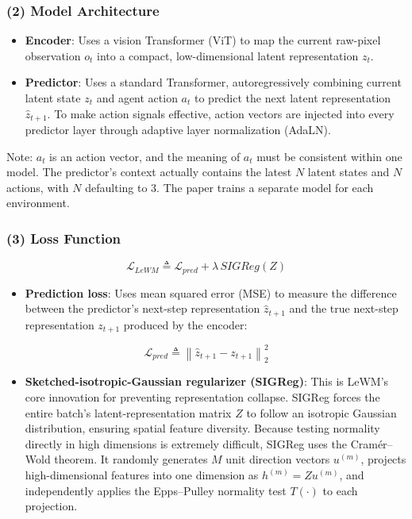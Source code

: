\hypertarget{model-architecture-1}{%
\subsubsection{(2) Model Architecture}\label{model-architecture-1}}

\begin{itemize}
\tightlist
\item
  \textbf{Encoder}: Uses a vision Transformer (ViT) to map the current raw-pixel observation \(o_t\) into a compact, low-dimensional latent representation \(z_t\).
\item
  \textbf{Predictor}: Uses a standard Transformer, autoregressively combining current latent state \(z_t\) and agent action \(a_t\) to predict the next latent representation \(\hat{z}_{t+1}\). To make action signals effective, action vectors are injected into every predictor layer through adaptive layer normalization (AdaLN).
\end{itemize}

Note: \(a_t\) is an action vector, and the meaning of \(a_t\) must be consistent within one model. The predictor's context actually contains the latest \(N\) latent states and \(N\) actions, with \(N\) defaulting to 3. The paper trains a separate model for each environment.

\hypertarget{loss-function-2}{%
\subsubsection{(3) Loss Function}\label{loss-function-2}}

\[
\mathcal{L}_{LeWM} \triangleq \mathcal{L}_{pred} + \lambda\,SIGReg(Z)
\]

\begin{itemize}
\tightlist
\item
{}
  \textbf{Prediction loss}: Uses mean squared error (MSE) to measure the difference between the predictor's next-step representation \(\hat{z}_{t+1}\) and the true next-step representation \(z_{t+1}\) produced by the encoder:
\end{itemize}

\[
\mathcal{L}_{pred} \triangleq \left\|\hat{z}_{t+1}-z_{t+1}\right\|_2^2
\]

\begin{itemize}
\tightlist
\item
  \textbf{Sketched-isotropic-Gaussian regularizer (SIGReg)}: This is LeWM's core innovation for preventing representation collapse. SIGReg forces the entire batch's latent-representation matrix \(Z\) to follow an isotropic Gaussian distribution, ensuring spatial feature diversity. Because testing normality directly in high dimensions is extremely difficult, SIGReg uses the Cramér--Wold theorem. It randomly generates \(M\) unit direction vectors \(u^{(m)}\), projects high-dimensional features into one dimension as \(h^{(m)} = Zu^{(m)}\), and independently applies the Epps--Pulley normality test \(T(\cdot)\) to each projection.
\end{itemize}

